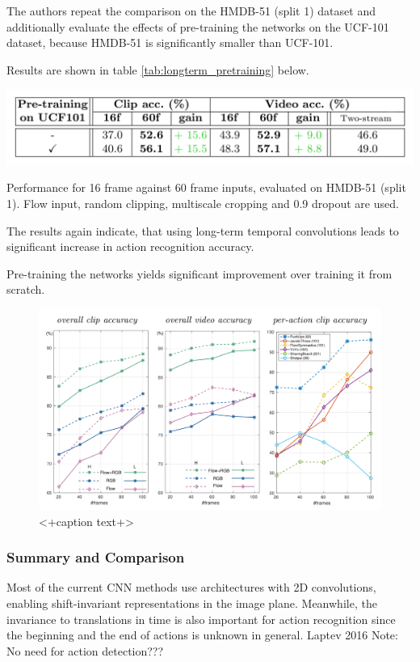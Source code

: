 The authors repeat the comparison on the HMDB-51 (split 1) dataset and additionally evaluate the effects of pre-training the networks on the UCF-101 dataset, because HMDB-51 is significantly smaller than UCF-101.

Results are shown in table \ref{tab:longterm_pretraining} below.

\begin{table}[H]
    \centering
    \includegraphics[width=\textwidth]{img_deep/longterm_pretraining}
    \caption{Performance for 16 frame against 60 frame inputs, evaluated on HMDB-51 (split 1). Flow input, random clipping, multiscale cropping and 0.9 dropout are used. \cite{varol_long-term_2016}}
    \label{tab:longterm_pretraining}
\end{table}

The results again indicate, that using long-term temporal convolutions leads to significant increase in action recognition accuracy.

Pre-training the networks yields significant improvement over training it from scratch. 

\begin{figure}[H]
    \centering
    \includegraphics[width=\textwidth]{img_deep/longterm_systematical}
    \caption{<+caption text+>}
    \label{fig:<+label+>}
\end{figure}

\subsubsection{Summary and Comparison}
Most of the current CNN methods use architectures with 2D convolutions, enabling shift-invariant representations in the image plane. Meanwhile, the invariance to translations in time is also important for action recognition since the beginning and the end of actions is unknown in general. Laptev 2016
Note: No need for action detection???

